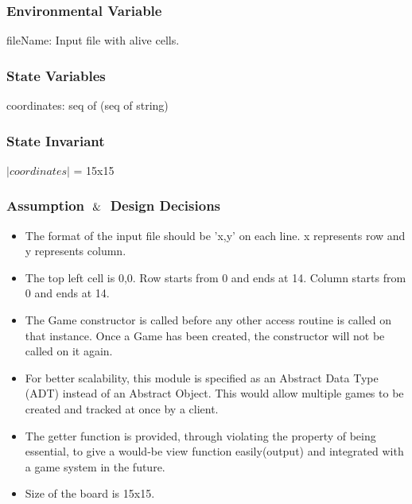 \documentclass[12pt]{article}
\begin{document}
\subsubsection* {Environmental Variable}

fileName: Input file with alive cells.\\ 

\subsubsection* {State Variables}

coordinates: seq of (seq of string)

\subsubsection* {State Invariant}

$|coordinates|$ = 15x15

\subsubsection* {Assumption $\And$ Design Decisions}

\begin{itemize}
    \item The format of the input file should be 'x,y' on each line. x represents row and y represents column.
    \item The top left cell is 0,0. Row starts from 0 and ends at 14. Column starts from 0 and ends at 14.
    \item The Game constructor is called before any other access routine is called on that instance. Once a Game has been created, the constructor will not be called on it again.
    \item For better scalability, this module is specified as an Abstract Data Type (ADT) instead of an Abstract Object. This would allow multiple games to be created and tracked at once by a client.
    \item The getter function is provided, through violating the property of being essential, to give a would-be view function easily(output) and integrated with a game system in the future.
    \item Size of the board is 15x15.
\end{itemize}
\end{document}
